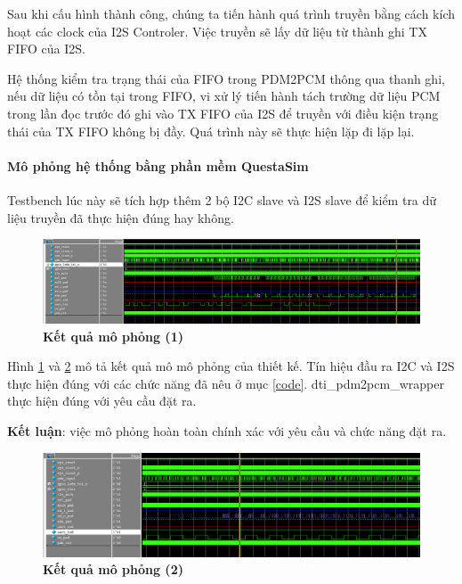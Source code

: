 Sau khi cấu hình thành công, chúng ta tiến hành quá trình truyền bằng cách kích hoạt các clock của I2S Controler. Việc truyền sẽ lấy dữ liệu từ thành ghi TX FIFO của I2S.

Hệ thống kiểm tra trạng thái của FIFO trong PDM2PCM thông qua thanh ghi, nếu dữ liệu có tồn tại trong FIFO, vi xử lý tiến hành tách trường dữ liệu PCM trong lần đọc trước đó ghi vào TX FIFO của I2S để truyền với điều kiện trạng thái của TX FIFO không bị đầy. Quá trình này sẽ thực hiện lặp đi lặp lại.

\paragraph{Mô phỏng hệ thống bằng phần mềm QuestaSim}

Testbench lúc này sẽ tích hợp thêm 2 bộ I2C slave và I2S slave để kiểm tra dữ liệu truyền đã thực hiện đúng hay không. 
\begin{figure}[H]
    \centering
    \includegraphics[width=15cm]{Images/Chuong5/fpga/sim_1.png}
    \caption[Kết quả mô phỏng (1)]{\bfseries \fontsize{12pt}{0pt}\selectfont Kết quả mô phỏng (1)}
    \label{sim_1}
\end{figure}
Hình \ref{sim_1} và \ref{sim_2} mô tả kết quả mô mô phỏng của thiết kế. Tín hiệu đầu ra I2C và I2S thực hiện đúng với các chức năng đã nêu ở mục \ref{code}. dti\_pdm2pcm\_wrapper thực hiện đúng với yêu cầu đặt ra.

\textbf{Kết luận}: việc mô phỏng hoàn toàn chính xác với yêu cầu và chức năng đặt ra.

\begin{figure}[H]
    \centering
    \includegraphics[width=15cm]{Images/Chuong5/fpga/sim_2.png}
    \caption[Kết quả mô phỏng (2)]{\bfseries \fontsize{12pt}{0pt}\selectfont Kết quả mô phỏng (2)}
    \label{sim_2}
\end{figure}



